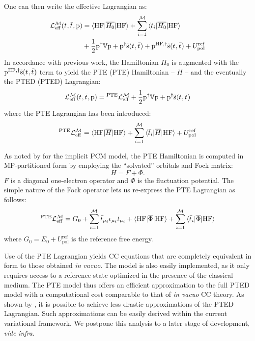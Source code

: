 One can then write the effective Lagrangian as:
\begin{equation}
  \begin{aligned}
  \mathcal{L}^\mathcal{M}_\mathrm{eff}(t_{}, \bar{t}_{}, \mathrm{p}) &=
  \braket{\mathrm{HF} | \overline{H_0} | \mathrm{HF}}
  + \sum_{i=1}^{\mathcal{M}}\braket{t_{i} | \overline{H_0} | \mathrm{HF}} \\
  &+
  \frac{1}{2}\mathrm{p}^\dagger\mathbb{V}\mathrm{p} + \mathrm{p}^\dagger\tilde{\mathrm{s}}(t_{},\bar{t}_{})
  + \mathrm{p}^{\mathrm{HF}, \dagger}\tilde{\mathrm{s}}(t_{},\bar{t}_{})
  + U_\mathrm{pol}^\mathrm{ref}
  \end{aligned}
\end{equation}
In accordance with previous work,\autocite{Cammi2009-gu, Caricato2011-tx} the
Hamiltonian $H_0$ is augmented with the
$\mathrm{p}^{\mathrm{HF},\dagger}\tilde{\mathrm{s}}(t_{},\bar{t}_{})$ term
to yield the \acl{PTE} (\acs{PTE}) Hamiltonian -- $H$ -- and the
eventually the \acl{PTED} (\acs{PTED}) Lagrangian:
\begin{equation}\label{eq:pted-cc}
  \mathcal{L}^\mathcal{M}_\mathrm{eff}(t_{}, \bar{t}_{}, \mathrm{p}) =
  {}^\mathrm{PTE}\mathcal{L}^\mathcal{M}_\mathrm{eff}
  + \frac{1}{2}\mathrm{p}^\dagger\mathbb{V}\mathrm{p} + \mathrm{p}^\dagger\tilde{\mathrm{s}}(t_{},\bar{t}_{})
\end{equation}
where the \acs{PTE} Lagrangian has been introduced:
\begin{equation}
{}^\mathrm{PTE}\mathcal{L}^\mathcal{M}_\mathrm{eff}
  =
  \braket{\mathrm{HF} | \overline{H} | \mathrm{HF}}
  + \sum_{i=1}^{\mathcal{M}}\braket{\bar{t}_{i} | \overline{H} | \mathrm{HF}}
  + U_\mathrm{pol}^\mathrm{ref}
\end{equation}

As noted by \citeauthor{Cammi2009-gu} for the implicit \acs{PCM} model,
the \acs{PTE} Hamiltonian is computed in \acs{MP}-partitioned form by
employing the ``solvated'' orbitals and Fock matrix:
\begin{equation}
  H = F + \Phi.
\end{equation}
$F$ is a diagonal one-electron operator and $\Phi$ is the
fluctuation potential.
The simple nature of the Fock operator lets us re-express the \acs{PTE}
Lagrangian as follows:
\begin{equation}
{}^\mathrm{PTE}\mathcal{L}^\mathcal{M}_\mathrm{eff}
  =
  G_0
  + \sum_{i=1}^{\mathcal{M}}\bar{t}_{\mu_i}\epsilon_{\mu_i}t_{\mu_i}
  + \braket{\mathrm{HF} | \overline{\Phi} | \mathrm{HF}}
  + \sum_{i=1}^{\mathcal{M}}\braket{\bar{t}_{i} | \overline{\Phi} | \mathrm{HF}}
\end{equation}
where $G_0 = E_0 + U_\mathrm{pol}^\mathrm{ref}$ is the reference free
energy.

Use of the \acs{PTE} Lagrangian yields \acs{CC} equations that are
completely equivalent in form to those obtained \emph{in vacuo}.
The model is also easily implemented, as it only requires access to a
reference state optimized in the presence of the classical medium.
The \acs{PTE} model thus offers an efficient approximation to the full
\acs{PTED} model with a computational cost comparable to that of
\emph{in vacuo} \acs{CC} theory.
As shown by \citeauthor{Caricato2011-tx}, it is possible to achieve less
drastic approximations of the \acs{PTED} Lagrangian. Such approximations
can be easily derived within the current variational framework. We
postpone this analysis to a later stage of development, \emph{vide
infra}.

